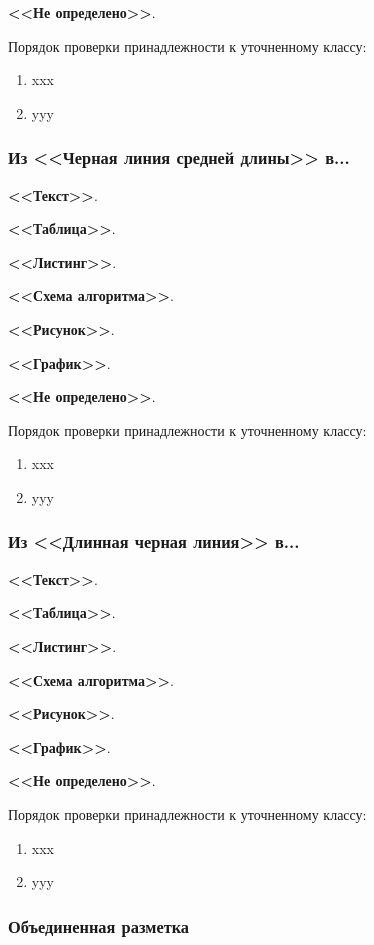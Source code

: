 \textbf{<<Не определено>>}.

Порядок проверки принадлежности к уточненному классу:
\begin{enumerate}
    \item xxx
    \item yyy
\end{enumerate}

\subsubsection*{Из <<Черная линия средней длины>> в...}

\textbf{<<Текст>>}.

\textbf{<<Таблица>>}.

\textbf{<<Листинг>>}.

\textbf{<<Схема алгоритма>>}.

\textbf{<<Рисунок>>}.

\textbf{<<График>>}.

\textbf{<<Не определено>>}.

Порядок проверки принадлежности к уточненному классу:
\begin{enumerate}
    \item xxx
    \item yyy
\end{enumerate}

\subsubsection*{Из <<Длинная черная линия>> в...}

\textbf{<<Текст>>}.

\textbf{<<Таблица>>}.

\textbf{<<Листинг>>}.

\textbf{<<Схема алгоритма>>}.

\textbf{<<Рисунок>>}.

\textbf{<<График>>}.

\textbf{<<Не определено>>}.

Порядок проверки принадлежности к уточненному классу:
\begin{enumerate}
    \item xxx
    \item yyy
\end{enumerate}

\subsubsection{Объединенная разметка}

